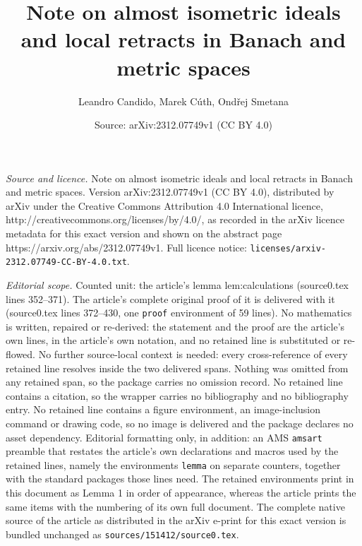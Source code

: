 \documentclass[10pt,a4paper]{amsart}
\title{Note on almost isometric ideals and local retracts in Banach and metric spaces}
\author{Leandro Candido, Marek C\'uth, Ond\v{r}ej Smetana}
\date{Source: arXiv:2312.07749v1 (CC BY 4.0)}
\begin{document}
\maketitle

\noindent\emph{Source and licence.} Note on almost isometric ideals and local retracts in Banach and metric spaces. Version arXiv:2312.07749v1 (CC BY 4.0), distributed by arXiv under the Creative Commons Attribution 4.0 International licence, http://creativecommons.org/licenses/by/4.0/, as recorded in the arXiv licence metadata for this exact version and shown on the abstract page https://arxiv.org/abs/2312.07749v1. Full licence notice: \texttt{licenses/arxiv-2312.07749-CC-BY-4.0.txt}.\par\smallskip

\noindent\textit{Editorial scope.} Counted unit: the article's lemma lem:calculations (source0.tex lines 352--371). The article's complete original proof of it is delivered with it (source0.tex lines 372--430, one \texttt{proof} environment of 59 lines). No mathematics is written, repaired or re-derived: the statement and the proof are the article's own lines, in the article's own notation, and no retained line is substituted or re-flowed.  No further source-local context is needed: every cross-reference of every retained line resolves inside the two delivered spans.  Nothing was omitted from any retained span, so the package carries no omission record.  No retained line contains a citation, so the wrapper carries no bibliography and no bibliography entry.  No retained line contains a figure environment, an image-inclusion command or drawing code, so no image is delivered and the package declares no asset dependency.  Editorial formatting only, in addition: an AMS \texttt{amsart} preamble that restates the article's own declarations and macros used by the retained lines, namely the environments \texttt{lemma} on separate counters, together with the standard packages those lines need.  The retained environments print in this document as Lemma 1 in order of appearance, whereas the article prints the same items with the numbering of its own full document.  The complete native source of the article as distributed in the arXiv e-print for this exact version is bundled unchanged as \texttt{sources/151412/source0.tex}.
\end{document}
